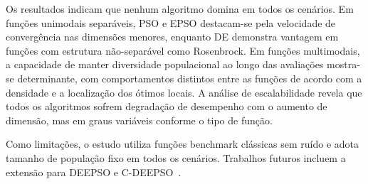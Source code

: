 \documentclass[runningheads]{llncs}
\begin{document}
Os resultados indicam que nenhum algoritmo domina em todos os cenários.
Em funções unimodais separáveis, PSO e EPSO destacam-se pela velocidade
de convergência nas dimensões menores, enquanto DE demonstra vantagem
em funções com estrutura não-separável como Rosenbrock. Em funções
multimodais, a capacidade de manter diversidade populacional ao longo
das avaliações mostra-se determinante, com comportamentos distintos
entre as funções de acordo com a densidade e a localização dos ótimos
locais. A análise de escalabilidade revela que todos os algoritmos
sofrem degradação de desempenho com o aumento de dimensão, mas em
graus variáveis conforme o tipo de função.

Como limitações, o estudo utiliza funções benchmark clássicas sem
ruído e adota tamanho de população fixo em todos os cenários. Trabalhos
futuros incluem a extensão para DEEPSO e C-DEEPSO~\cite{marcelino2018}.
\end{document}
